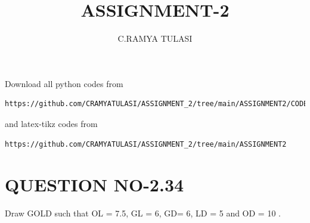 \documentclass[journal,12pt,twocolumn]{IEEEtran}
\begin{document}
     \def\rightbox#1{\makebox[0in][r]{#1}}
     \def\centbox#1{\makebox[0in]{#1}}
     \def\topbox#1{\raisebox{-\baselineskip}[0in][0in]{#1}}
     \def\midbox#1{\raisebox{-0.5\baselineskip}[0in][0in]{#1}}
\vspace{3cm}
\title{ASSIGNMENT-2}
\author{C.RAMYA TULASI}
\maketitle
\newpage
\bigskip
\renewcommand{\thefigure}{\theenumi}
\renewcommand{\thetable}{\theenumi}
Download all python codes from 
\begin{lstlisting}
https://github.com/CRAMYATULASI/ASSIGNMENT_2/tree/main/ASSIGNMENT2/CODES
\end{lstlisting}
%
and latex-tikz codes from 
%
\begin{lstlisting}
https://github.com/CRAMYATULASI/ASSIGNMENT_2/tree/main/ASSIGNMENT2
\end{lstlisting}
%
\section{QUESTION NO-2.34}
\item Draw GOLD such that OL = 7.5, GL = 6, GD= 6, LD = 5 and OD = 10 .
%
\end{document}
